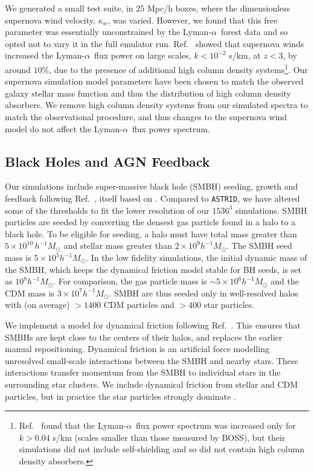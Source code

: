 \documentclass[a4paper,11pt]{article}
\newcommand{\Lya}{Lyman-$\alpha$}
\newcommand{\astrid}{\texttt{ASTRID}}
\begin{document}
We generated a small test suite, in $25$ Mpc/h boxes, where the dimensionless supernova wind velocity, $\kappa_w$, was varied. However, we found that this free parameter was essentially unconstrained by the \Lya~forest data and so opted not to vary it in the full emulator run. Ref.~\cite{Bolton:2017} showed that supernova winds increased the \Lya~flux power on large scales, $k < 10^{-2}$ s/km, at $z < 3$, by around $10\%$, due to the presence of additional high column density systems\footnote{Ref.~\cite{Viel:2013} found that the \Lya~flux power spectrum was increased only for $ k > 0.04$ s/km (scales smaller than those measured by BOSS), but their simulations did not include self-shielding and so did not contain high column density absorbers.}. Our supernova simulation model parameters have been chosen to match the observed galaxy stellar mass function and thus the distribution of high column density absorbers. We remove high column density systems from our simulated spectra to match the observational procedure, and thus changes to the supernova wind model do not affect the \Lya~flux power spectrum.

\subsection{Black Holes and AGN Feedback}
\label{sec:agn}

Our simulations include super-massive black hole (SMBH) seeding, growth and feedback following Ref.~\cite{Ni:2022}, itself based on \cite{Feng:2016,SDH2005,DSH2005}. Compared to \astrid, we have altered some of the thresholds to fit the lower resolution of our $1536^3$ simulations. SMBH particles are seeded by converting the densest gas particle found in a halo to a black hole. To be eligible for seeding, a halo must have total mass greater than $5\times 10^{10}\,h^{-1}M_\odot$ and stellar mass greater than $2 \times 10^9 h^{-1} M_\odot$. The SMBH seed mass is $5 \times 10^{5} h^{-1} M_\odot$. In the low fidelity simulations, the initial dynamic mass of the SMBH, which keeps the dynamical friction model stable for BH seeds, is set as $10^{8} h^{-1} M_\odot$. For comparison, the gas particle mass is $\sim 5 \times 10^6 h^{-1} M_\odot$ and the CDM mass is $ 3 \times 10^7 h^{-1} M_\odot$. SMBH are thus seeded only in well-resolved halos with (on average) $> 1400$ CDM particles and $>400$ star particles.

We implement a model for dynamical friction following Ref.~\citep{Chen:2021}. This ensures that SMBHs are kept close to the centers of their halos, and replaces the earlier manual repositioning. Dynamical friction is an artificial force modelling unresolved small-scale interactions between the SMBH and nearby stars. These interactions transfer momentum from the SMBH to individual stars in the surrounding star clusters. We include dynamical friction from stellar and CDM particles, but in practice the star particles strongly dominate \cite{Chen:2021}.
\end{document}
